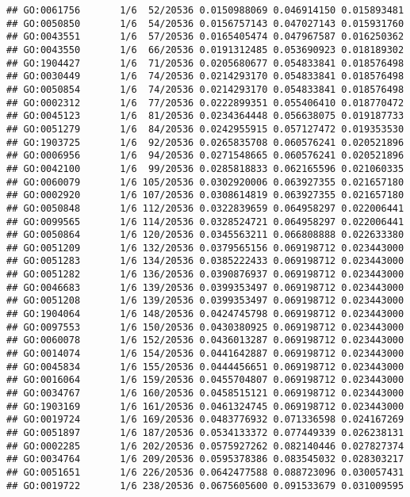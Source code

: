 \documentclass[
]{article}
\begin{document}
\begin{verbatim}
## GO:0061756       1/6  52/20536 0.0150988069 0.046914150 0.015893481
## GO:0050850       1/6  54/20536 0.0156757143 0.047027143 0.015931760
## GO:0043551       1/6  57/20536 0.0165405474 0.047967587 0.016250362
## GO:0043550       1/6  66/20536 0.0191312485 0.053690923 0.018189302
## GO:1904427       1/6  71/20536 0.0205680677 0.054833841 0.018576498
## GO:0030449       1/6  74/20536 0.0214293170 0.054833841 0.018576498
## GO:0050854       1/6  74/20536 0.0214293170 0.054833841 0.018576498
## GO:0002312       1/6  77/20536 0.0222899351 0.055406410 0.018770472
## GO:0045123       1/6  81/20536 0.0234364448 0.056638075 0.019187733
## GO:0051279       1/6  84/20536 0.0242955915 0.057127472 0.019353530
## GO:1903725       1/6  92/20536 0.0265835708 0.060576241 0.020521896
## GO:0006956       1/6  94/20536 0.0271548665 0.060576241 0.020521896
## GO:0042100       1/6  99/20536 0.0285818833 0.062165596 0.021060335
## GO:0060079       1/6 105/20536 0.0302920006 0.063927355 0.021657180
## GO:0002920       1/6 107/20536 0.0308614819 0.063927355 0.021657180
## GO:0050848       1/6 112/20536 0.0322839659 0.064958297 0.022006441
## GO:0099565       1/6 114/20536 0.0328524721 0.064958297 0.022006441
## GO:0050864       1/6 120/20536 0.0345563211 0.066808888 0.022633380
## GO:0051209       1/6 132/20536 0.0379565156 0.069198712 0.023443000
## GO:0051283       1/6 134/20536 0.0385222433 0.069198712 0.023443000
## GO:0051282       1/6 136/20536 0.0390876937 0.069198712 0.023443000
## GO:0046683       1/6 139/20536 0.0399353497 0.069198712 0.023443000
## GO:0051208       1/6 139/20536 0.0399353497 0.069198712 0.023443000
## GO:1904064       1/6 148/20536 0.0424745798 0.069198712 0.023443000
## GO:0097553       1/6 150/20536 0.0430380925 0.069198712 0.023443000
## GO:0060078       1/6 152/20536 0.0436013287 0.069198712 0.023443000
## GO:0014074       1/6 154/20536 0.0441642887 0.069198712 0.023443000
## GO:0045834       1/6 155/20536 0.0444456651 0.069198712 0.023443000
## GO:0016064       1/6 159/20536 0.0455704807 0.069198712 0.023443000
## GO:0034767       1/6 160/20536 0.0458515121 0.069198712 0.023443000
## GO:1903169       1/6 161/20536 0.0461324745 0.069198712 0.023443000
## GO:0019724       1/6 169/20536 0.0483776932 0.071336598 0.024167269
## GO:0051897       1/6 187/20536 0.0534133372 0.077449339 0.026238131
## GO:0002285       1/6 202/20536 0.0575927262 0.082140446 0.027827374
## GO:0034764       1/6 209/20536 0.0595378386 0.083545032 0.028303217
## GO:0051651       1/6 226/20536 0.0642477588 0.088723096 0.030057431
## GO:0019722       1/6 238/20536 0.0675605600 0.091533679 0.031009595

\end{verbatim}
\end{document}

